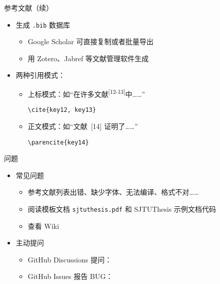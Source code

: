 \begin{frame}[fragile]{参考文献（续）}
  \begin{itemize}
    \item 生成 \verb|.bib| 数据库
          \begin{itemize}
            \item Google Scholar 可直接复制或者批量导出
            \item 用 Zotero、Jabref 等文献管理软件生成
          \end{itemize}
    \item 两种引用模式：
          \begin{itemize}
            \item 上标模式：如“在许多文献\textsuperscript{[12-13]}中……”
                  \begin{lstlisting}[basicstyle=\ttfamily]
    \cite{key12, key13}
          \end{lstlisting}
            \item 正文模式：如“文献~[14] 证明了……”
                  \begin{lstlisting}[basicstyle=\ttfamily]
    \parencite{key14}
          \end{lstlisting}
          \end{itemize}
  \end{itemize}
\end{frame}

\begin{frame}[fragile]{\SJTUThesis 问题}
  \begin{itemize}
    \item 常见问题
          \begin{itemize}
            \item 参考文献列表出错、缺少字体、无法编译、格式不对……
            \item 阅读模板文档 \verb|sjtuthesis.pdf| 和 SJTUThesis 示例文档代码
            \item 查看 Wiki 
          \end{itemize}

    \item 主动提问
          \begin{itemize}
            \item GitHub Discussions
                  提问：
            \item GitHub Issues 报告
                  BUG：
          \end{itemize}

  \end{itemize}
\end{frame}
